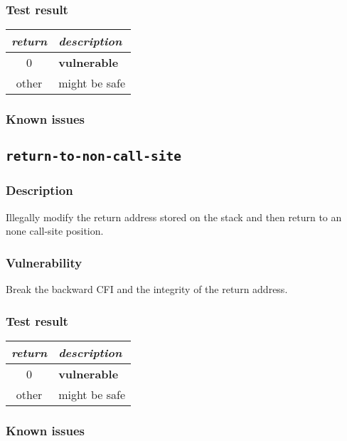 \documentclass[a4paper]{book}
\begin{document}
\subsubsection{Test result}
\begin{tabular}{cl}
  \toprule
  \emph{return}  & \emph{description} \\
  \midrule
  0              & \textbf{vulnerable} \\
  other          & might be safe \\
  \bottomrule
\end{tabular}
  
\subsubsection{Known issues}

\newpage
\subsection{\texttt{return-to-non-call-site}}\label{test-return-to-non-call-site}

\subsubsection{Description}
Illegally modify the return address stored on the stack and then return to an none call-site position.

\subsubsection{Vulnerability}
Break the backward CFI and the integrity of the return address.

\subsubsection{Test result}
\begin{tabular}{cl}
  \toprule
  \emph{return}  & \emph{description} \\
  \midrule
  0              & \textbf{vulnerable} \\
  other          & might be safe \\
  \bottomrule
\end{tabular}
  
\subsubsection{Known issues}
\end{document}
